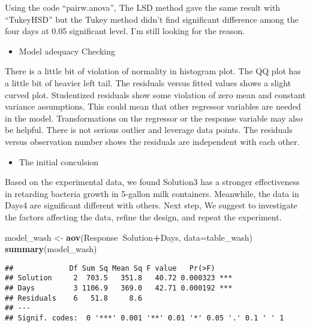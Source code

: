\documentclass[]{article}
\newenvironment{Shaded}{\begin{snugshade}}{\end{snugshade}}
\newcommand{\DataTypeTok}[1]{\textcolor[rgb]{0.13,0.29,0.53}{#1}}
\newcommand{\KeywordTok}[1]{\textcolor[rgb]{0.13,0.29,0.53}{\textbf{#1}}}
\newcommand{\NormalTok}[1]{#1}
\newcommand{\OperatorTok}[1]{\textcolor[rgb]{0.81,0.36,0.00}{\textbf{#1}}}
\newcommand{\StringTok}[1]{\textcolor[rgb]{0.31,0.60,0.02}{#1}}
\providecommand{\tightlist}{%
  \setlength{\itemsep}{0pt}\setlength{\parskip}{0pt}}
\begin{document}
Using the code ``pairw.anova'', The LSD method gave the same result with
``TukeyHSD'' but the Tukey method didn't find significant difference
among the four days at 0.05 significant level. I'm still looking for the
reason.

\begin{itemize}
\tightlist
\item
  Model adequacy Checking
\end{itemize}

There is a little bit of violation of normality in histogram plot. The
QQ plot has a little bit of heavier left tail. The residuals versus
fitted values shows a slight curved plot. Studentized residuals show
some violation of zero mean and constant variance assumptions. This
could mean that other regressor variables are needed in the model.
Transformations on the regressor or the response variable may also be
helpful. There is not serious outlier and leverage data points. The
residuals versus observation number shows the residuals are independent
with each other.

\begin{itemize}
\tightlist
\item
  The initial conculsion
\end{itemize}

Based on the experimental data, we found Solution3 has a stronger
effectiveness in retarding bacteria growth in 5-gallon milk containers.
Meanwhile, the data in Days4 are significant different with others. Next
step, We suggest to investigate the factors affecting the data, refine
the design, and repeat the experiment.

\begin{Shaded}
\begin{Highlighting}[]
\NormalTok{model_wash <-}\StringTok{ }\KeywordTok{aov}\NormalTok{(Response}\OperatorTok{~}\NormalTok{Solution}\OperatorTok{+}\NormalTok{Days, }\DataTypeTok{data=}\NormalTok{table_wash)}
\KeywordTok{summary}\NormalTok{(model_wash)}
\end{Highlighting}
\end{Shaded}

\begin{verbatim}
##             Df Sum Sq Mean Sq F value   Pr(>F)    
## Solution     2  703.5   351.8   40.72 0.000323 ***
## Days         3 1106.9   369.0   42.71 0.000192 ***
## Residuals    6   51.8     8.6                     
## ---
## Signif. codes:  0 '***' 0.001 '**' 0.01 '*' 0.05 '.' 0.1 ' ' 1
\end{verbatim}
\end{document}
